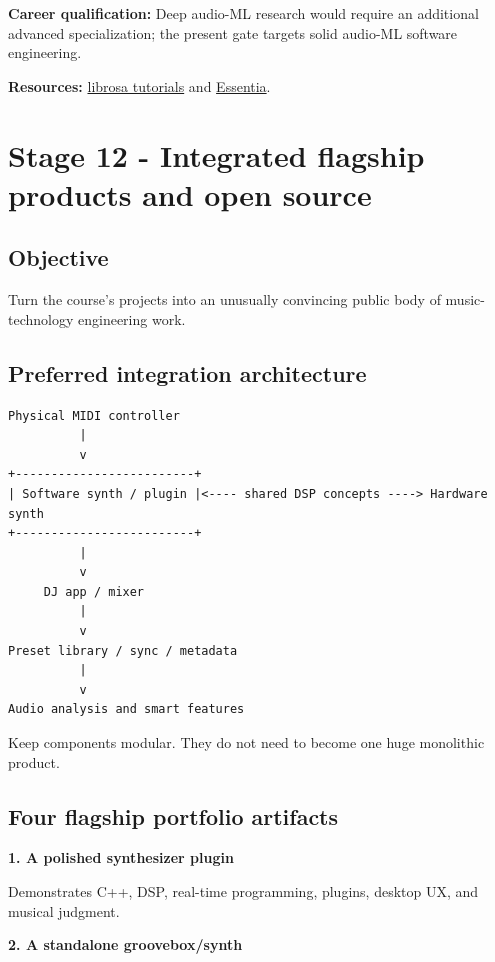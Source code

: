 \documentclass[11pt,letterpaper]{article}
\begin{document}
\textbf{Career qualification:} Deep audio-ML research would require an additional advanced specialization; the present gate targets solid audio-ML software engineering.

\textbf{Resources:} \href{https://librosa.org/doc/latest/auto_tutorials/}{librosa tutorials} and \href{https://essentia.upf.edu/}{Essentia}.

\clearpage

\section{Stage 12 - Integrated flagship products and open source}\label{stage-12-integrated-flagship-products-and-open-source}

\subsection*{Objective}\label{objective-12}

Turn the course's projects into an unusually convincing public body of music-technology engineering work.

\subsection*{Preferred integration architecture}\label{preferred-integration-architecture}

{\footnotesize
\begin{verbatim}
Physical MIDI controller
          |
          v
+-------------------------+
| Software synth / plugin |<---- shared DSP concepts ----> Hardware synth
+-------------------------+
          |
          v
     DJ app / mixer
          |
          v
Preset library / sync / metadata
          |
          v
Audio analysis and smart features
\end{verbatim}
}

Keep components modular. They do not need to become one huge monolithic product.

\subsection*{Four flagship portfolio artifacts}\label{four-flagship-portfolio-artifacts}

\textbf{1. A polished synthesizer plugin}

Demonstrates C++, DSP, real-time programming, plugins, desktop UX, and musical judgment.

\textbf{2. A standalone groovebox/synth}
\end{document}
